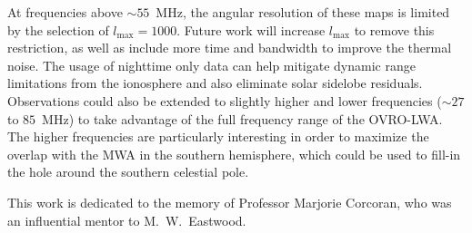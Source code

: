 \documentclass[twocolumn]{aastex61}
\begin{document}
At frequencies above $\sim55$~MHz, the angular resolution of these maps is limited by the selection
of $l_\text{max}=1000$. Future work will increase $l_\text{max}$ to remove this restriction, as well
as include more time and bandwidth to improve the thermal noise. The usage of nighttime only data
can help mitigate dynamic range limitations from the ionosphere and also eliminate solar sidelobe
residuals. Observations could also be extended to slightly higher and lower frequencies ($\sim27$ to
$85$~MHz) to take advantage of the full frequency range of the OVRO-LWA. The higher frequencies are
particularly interesting in order to maximize the overlap with the MWA in the southern hemisphere,
which could be used to fill-in the hole around the southern celestial pole.

\acknowledgments
This work is dedicated to the memory of Professor Marjorie Corcoran, who was an influential mentor
to M.~W.~Eastwood.



\end{document}

